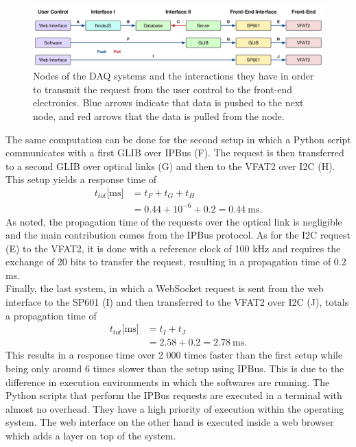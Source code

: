       \begin{figure}[t!]
        \centering
        \includegraphics[width=\textwidth]{img/III-2-web-daq/ctrl_req}
        \caption{Nodes of the DAQ systems and the interactions they have in order to transmit the request from the user control to the front-end electronics. Blue arrows indicate that data is pushed to the next node, and red arrows that the data is pulled from the node.}
        \label{fig:III-2-ctrl-req}
      \end{figure}

      The same computation can be done for the second setup in which a Python script communicates with a first GLIB over IPBus (F). The request is then transferred to a second GLIB over optical links (G) and then to the VFAT2 over I2C (H). This setup yields a response time of
      \begin{equation}
        \begin{split}
          t_{tot}\text{[ms]} & = t_F + t_G + t_H \\
                             & = 0.44 + 10^{-6} + 0.2 = 0.44 \ \text{ms}.
        \end{split}
      \end{equation}
      As noted, the propagation time of the requests over the optical link is negligible and the main contribution comes from the IPBus protocol. As for the I2C request (E) to the VFAT2, it is done with a reference clock of 100 kHz and requires the exchange of 20 bits to transfer the request, resulting in a propagation time of 0.2 ms. \\

      Finally, the last system, in which a WebSocket request is sent from the web interface to the SP601 (I) and then transferred to the VFAT2 over I2C (J), totals a propagation time of
      \begin{equation}
        \begin{split}
          t_{tot}\text{[ms]} & = t_I + t_J \\
                             & = 2.58 + 0.2 = 2.78 \ \text{ms}.
        \end{split}
      \end{equation}
      This results in a response time over 2 000 times faster than the first setup while being only around 6 times slower than the setup using IPBus. This is due to the difference in execution environments in which the softwares are running. The Python scripts that perform the IPBus requests are executed in a terminal with almost no overhead. They have a high priority of execution within the operating system. The web interface on the other hand is executed inside a web browser which adds a layer on top of the system.

